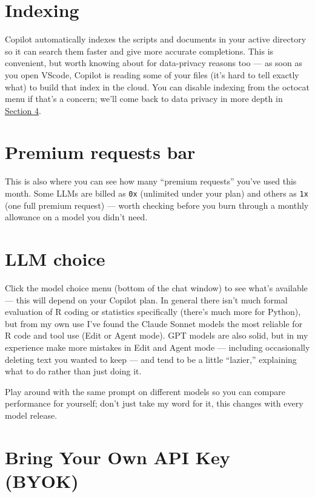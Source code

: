 \documentclass[
  letterpaper,
  DIV=11,
  numbers=noendperiod]{scrreprt}
\begin{document}
\section{Indexing}\label{indexing}

Copilot automatically indexes the scripts and documents in your active
directory so it can search them faster and give more accurate
completions. This is convenient, but worth knowing about for
data-privacy reasons too --- as soon as you open VScode, Copilot is
reading some of your files (it's hard to tell exactly what) to build
that index in the cloud. You can disable indexing from the octocat menu
if that's a concern; we'll come back to data privacy in more depth in
\href{../section-4-security-privacy/04-keeping-data-secure.qmd}{Section
4}.

\section{Premium requests bar}\label{premium-requests-bar}

This is also where you can see how many ``premium requests'' you've used
this month. Some LLMs are billed as \texttt{0x} (unlimited under your
plan) and others as \texttt{1x} (one full premium request) --- worth
checking before you burn through a monthly allowance on a model you
didn't need.

\section{LLM choice}\label{llm-choice}

Click the model choice menu (bottom of the chat window) to see what's
available --- this will depend on your Copilot plan. In general there
isn't much formal evaluation of R coding or statistics specifically
(there's much more for Python), but from my own use I've found the
Claude Sonnet models the most reliable for R code and tool use (Edit or
Agent mode). GPT models are also solid, but in my experience make more
mistakes in Edit and Agent mode --- including occasionally deleting text
you wanted to keep --- and tend to be a little ``lazier,'' explaining
what to do rather than just doing it.

Play around with the same prompt on different models so you can compare
performance for yourself; don't just take my word for it, this changes
with every model release.

\section{Bring Your Own API Key
(BYOK)}\label{bring-your-own-api-key-byok}
\end{document}
